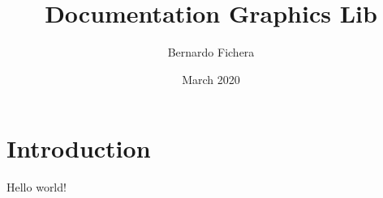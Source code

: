 \documentclass[12pt]{article}
\title{Documentation Graphics Lib}
\author{Bernardo Fichera}
\date{March 2020}
\begin{document}
\maketitle

\section*{Introduction}

Hello world!
\end{document}
